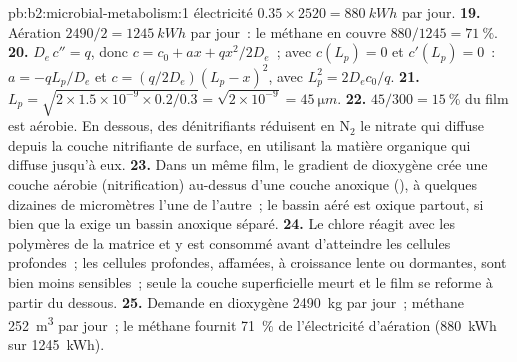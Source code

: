\begin{solution}{pb:b2:microbial-metabolism:1}
électricité $0.35\times 2520 = \qty{880}{kWh}$ par jour.
\textbf{19.} Aération $2490/2 = \qty{1245}{kWh}$ par jour~: le méthane
en couvre $880/1245 = \qty{71}{\%}$.
\textbf{20.} $D_e\,c'' = q$, donc $c = c_0 + ax + qx^2/2D_e$~; avec
$c(L_p) = 0$ et $c'(L_p) = 0$~: $a = -qL_p/D_e$ et $c =
(q/2D_e)(L_p - x)^2$, avec $L_p^2 = 2D_ec_0/q$.
\textbf{21.} $L_p = \sqrt{2\times 1.5\times 10^{-9}\times 0.2/0.3} =
\sqrt{2\times 10^{-9}} = \qty{45}{\micro m}$.
\textbf{22.} $45/300 = \qty{15}{\%}$ du film est aérobie. En dessous,
des dénitrifiants réduisent en $\mathrm{N_2}$ le nitrate qui diffuse
depuis la couche nitrifiante de surface, en utilisant la matière
organique qui diffuse jusqu'à eux.
\textbf{23.} Dans un même film, le gradient de dioxygène crée une
couche aérobie (nitrification) au-dessus d'une couche anoxique
(), à quelques dizaines de micromètres l'une de l'autre~;
le bassin aéré est oxique partout, si bien que la  exige
un bassin anoxique séparé.
\textbf{24.} Le chlore réagit avec les polymères de la matrice et y est
consommé avant d'atteindre les cellules profondes~; les cellules
profondes, affamées, à croissance lente ou dormantes, sont bien moins
sensibles~; seule la couche superficielle meurt et le film se reforme
à partir du dessous.
\textbf{25.} Demande en dioxygène \qty{2490}{kg} par jour~; méthane
\qty{252}{m^3} par jour~; le méthane fournit \qty{71}{\%} de
l'électricité d'aération (\qty{880}{kWh} sur \qty{1245}{kWh}).
\end{solution}
